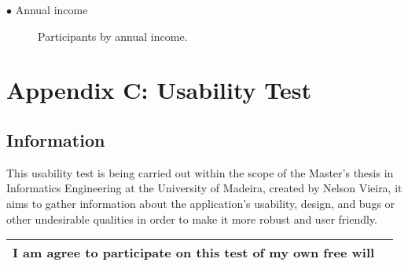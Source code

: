 $\bullet$ Annual income

\begin{figure}[H]
    \begin{center}
        \caption*{Participants by annual income.}
        \label{fig:survey_dd_annual_income}
    \end{center}
\end{figure}

\clearpage

\section*[Appendix C]{Appendix C: Usability Test}\label{appendix:usability_tests}

\subsection*{Information}

This usability test is being carried out within the scope of the Master's thesis
in Informatics Engineering at the University of Madeira, created by Nelson Vieira,
it aims to gather information about the application's usability, design, and bugs
or other undesirable qualities in order to make it more robust and user friendly. \\

\begin{tabular}{|m{13cm}|m{1cm}|}
    \hline
    I am agree to participate on this test of my own free will & \\
    \hline
\end{tabular}


